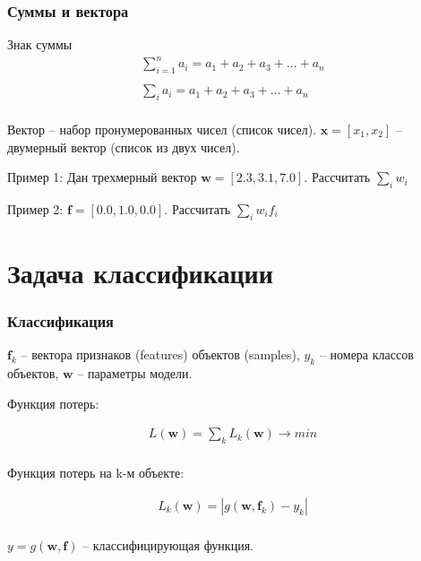\documentclass[fullscreen=true, bookmarks=false]{beamer} %
\begin{document}

\begin{frame}{}
 \frametitle{Суммы и вектора}

Знак суммы
\begin{gather*}
\nonumber
\sum_{i=1}^n a_i = a_1 + a_2 + a_3 + \ldots + a_n\\
\nonumber \\
\nonumber
\sum_i a_i = a_1 + a_2 + a_3 + \ldots + a_n\\
\end{gather*}

Вектор -- набор пронумерованных чисел (список чисел). $\bm{x} = [x_1, x_2]$ -- двумерный вектор (список из двух чисел).


Пример 1: Дан трехмерный вектор $\bm{w} = [2.3, 3.1, 7.0]$. Рассчитать $\sum_i w_i$


Пример 2: $\bm{f} = [0.0, 1.0, 0.0]$. Рассчитать $\sum_i w_i f_i$

\end{frame}


\section{Задача классификации}


\begin{frame}{}
 \frametitle{Классификация}

$\bm{f}_k$ -- вектора признаков (features) объектов (samples), $y_k$ -- номера классов объектов, $\bm{w}$ -- параметры модели. 

 Функция потерь:

\begin{gather*}
\nonumber
L(\bm{w}) = \sum_k L_k(\bm{w}) \rightarrow min\\
\end{gather*}

Функция потерь на k-м объекте:

 \begin{gather*}
 \nonumber
 L_k(\bm{w}) = |g(\bm{w}, \bm{f}_k) - y_k|\\
 \end{gather*}

 $y = g(\bm{w}, \bm{f})$ -- классифицирующая функция.

\end{frame}
\end{document}
